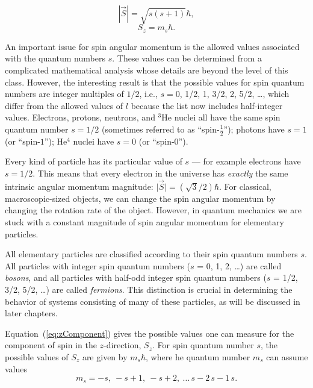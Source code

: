 \begin{equation}
|\vec{S}| = \sqrt{s(s+1)}\hbar,
\end{equation}
\begin{equation}
S_z = m_s \hbar .
\label{eq:zComponent}
\end{equation}

An important issue for spin angular momentum 
is the allowed values associated with the quantum numbers
$s$. These values can be determined from a complicated mathematical
analysis whose details are beyond the level of this class.  However,
the interesting result is that the possible values for spin quantum
numbers are integer multiples of $1/2$, i.e., $s = 0$, 1/2, 1, 
3/2, 2, 5/2, \dots, which differ from the allowed values of $l$
because the list now includes half-integer values.  Electrons, protons,
neutrons, and $^3$He nuclei all have the same spin quantum number
$s=1/2$ (sometimes referred to as ``spin-$\frac{1}{2}$'');
photons have $s=1$ (or ``spin-$1$''); He$^4$ nuclei have $s=0$
(or ``spin-$0$'').

Every kind of particle has its particular value of $s$ --- for example
electrons have $s=1/2$.  This means that every electron in the universe
has {\em exactly} the same intrinsic angular momentum magnitude: $\vert
\vec{S}\vert = (\sqrt{3}/2)\hbar$.  For classical, macroscopic-sized
objects, we can change the spin angular momentum by changing the rotation
rate of the object. However, in quantum mechanics we are stuck with
a constant magnitude of spin angular momentum for elementary particles.

All elementary particles are classified according to their spin quantum
numbers $s$.  All particles with integer spin quantum numbers ($s$
= 0, 1, 2, \dots ) are called {\it bosons\/}, and all particles with
half-odd integer spin quantum numbers ($s$ = 1/2, 3/2, 5/2, \dots )
are called {\it fermions\/}.  This distinction is crucial in determining
the behavior of systems consisting of many of these particles, as will
be discussed in later chapters.

Equation~(\ref{eq:zComponent}) gives the possible values one can
measure for the component of spin in the $z$-direction, $S_z$.  For spin
quantum number $s$, the possible values of $S_z$ are given by $m_s\hbar$,
where he quantum number $m_s$ can assume values 
\begin{equation} 
m_s = -s,\ -s+1,\ -s+2,\ \dots\, s-2\, s-1\, s. 
\end{equation}

